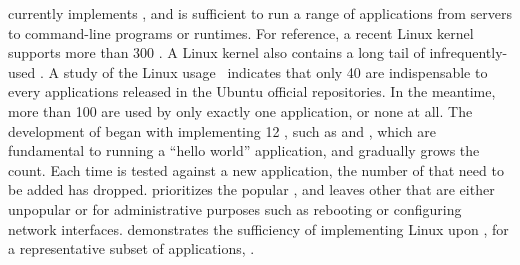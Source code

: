 







\Thelibos{} currently implements \graphenesyscallnum{} \linuxapis{},
and is sufficient to run a range of applications from servers to command-line programs or runtimes.
For reference, a recent Linux kernel supports more than 300 \linuxapis{}.
A Linux kernel also
contains a long tail of infrequently-used \linuxapis{}.
A study of the Linux \linuxapi{} usage~\cite{tsai16apistudy}
indicates that only 40 \linuxapis{} are indispensable to every applications released in the Ubuntu official repositories.
In the meantime, more than 100 \linuxapis{} are used by only exactly one application,
or none at all.
The development of \thelibos{} began with
implementing 12 \linuxapis{}, such as  and , which are fundamental to running a ``hello world'' application,
and gradually grows the \linuxapi{} count.
Each time \thelibos{} is tested against a new application, the number of \linuxapis{} that need to be added has dropped.
\graphene{} prioritizes the popular \linuxapis{}, and leaves other \linuxapis{} that are either unpopular or for administrative purposes such as rebooting
or configuring network interfaces.
\thelibos{} demonstrates the sufficiency of
implementing Linux \linuxapis{} upon \thehostabi{},
for a representative subset of applications, .


